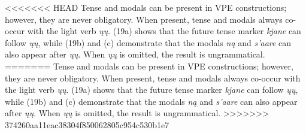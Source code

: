 \documentclass[output=paper]{LSP/langsci}
\begin{document}
<<<<<<< HEAD
Tense and modals can be present in VPE constructions; however, they are never obligatory. When present, tense and modals always co-occur with the light verb \emph{ųų}. (19a) shows that the future tense marker \emph{kjane} can follow \emph{ųų}, while (19b) and (c) demonstrate that the modals \emph{ną} and \emph{s'aare} can also appear after \emph{ųų}. When \emph{ųų} is omitted, the result is ungrammatical.
=======
Tense and modals can be present in VPE constructions; however, they are never obligatory. When present, tense and modals always co-occur with the light verb \emph{\k{u}\k{u}}. (19a) shows that the future tense marker \emph{kjane} can follow \emph{\k{u}\k{u}}, while (19b) and (c) demonstrate that the modals \emph{n\k{a}} and \emph{s'aare} can also appear after \emph{\k{u}\k{u}}. When \emph{\k{u}\k{u}} is omitted, the result is ungrammatical.
>>>>>>> 374260aa11eac38304f850062805c954c530b1e7
\end{document}
